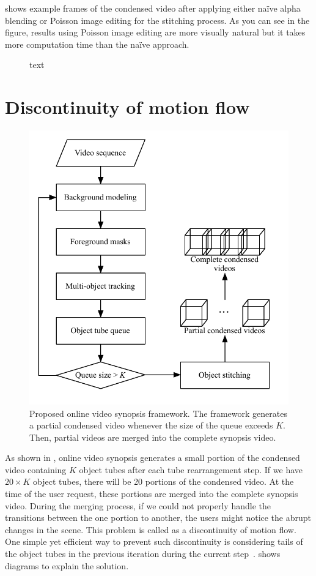 \documentclass[11pt]{hyu_thesis}
\begin{document}
 shows example frames of the condensed video after applying either na\"ive alpha blending or Poisson image editing for the stitching process. As you can see in the figure, results using Poisson image editing are more visually natural but it takes more computation time than the na\"ive approach.
\begin{figure}
	\centering
	\caption{text}
	\label{fig:poisson_fg_bg}
\end{figure}

\section{Discontinuity of motion flow}
\begin{figure}
	\centering
	\includegraphics[width=0.8\linewidth]{framework.pdf}
	\caption{Proposed online video synopsis framework. The framework generates a partial condensed video whenever the size of the queue exceeds $K$. Then, partial videos are merged into the complete synopsis video.}
	\label{fig:framework}
\end{figure}
As shown in , online video synopsis generates a small portion of the condensed video containing $K$ object tubes after each tube rearrangement step. If we have $20 \times K$ object tubes, there will be 20 portions of the condensed video. At the time of the user request, these portions are merged into the complete synopsis video. During the merging process, if we could not properly handle the transitions between the one portion to another, the users might notice the abrupt changes in the scene. This problem is called as a discontinuity of motion flow. One simple yet efficient way to prevent such discontinuity is considering tails of the object tubes in the previous iteration during the current step~\cite{Fu2014}.  shows diagrams to explain the solution.
\end{document}
